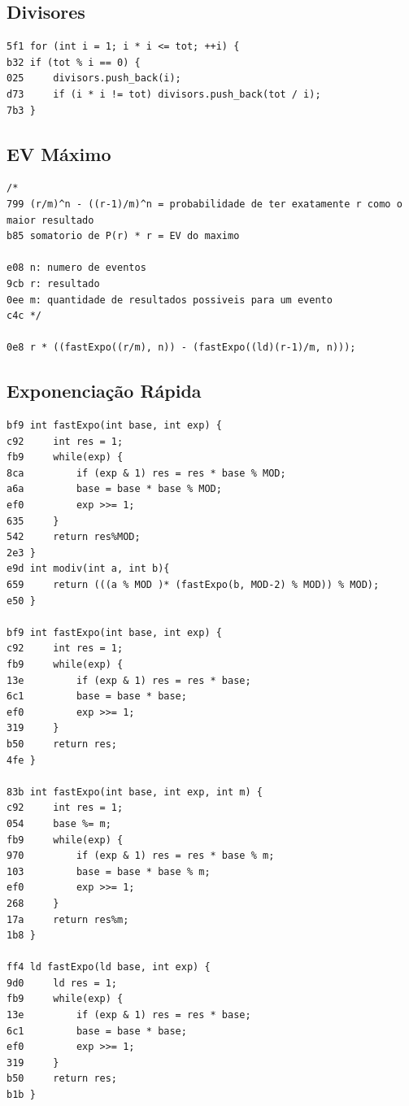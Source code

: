 \documentclass[11pt, a4paper, twoside]{article}
\begin{document}
\subsection{Divisores}
\begin{lstlisting}
5f1 for (int i = 1; i * i <= tot; ++i) {
b32 if (tot % i == 0) {
025     divisors.push_back(i);
d73     if (i * i != tot) divisors.push_back(tot / i);
7b3 }
\end{lstlisting}

\subsection{EV Máximo}
\begin{lstlisting}
/*
799 (r/m)^n - ((r-1)/m)^n = probabilidade de ter exatamente r como o maior resultado 
b85 somatorio de P(r) * r = EV do maximo

e08 n: numero de eventos
9cb r: resultado
0ee m: quantidade de resultados possiveis para um evento
c4c */

0e8 r * ((fastExpo((r/m), n)) - (fastExpo((ld)(r-1)/m, n)));
\end{lstlisting}

\subsection{Exponenciação Rápida}
\begin{lstlisting}
bf9 int fastExpo(int base, int exp) {
c92     int res = 1;
fb9     while(exp) {
8ca         if (exp & 1) res = res * base % MOD;
a6a         base = base * base % MOD;
ef0         exp >>= 1;
635     }
542     return res%MOD;
2e3 }
e9d int modiv(int a, int b){
659     return (((a % MOD )* (fastExpo(b, MOD-2) % MOD)) % MOD);
e50 }

bf9 int fastExpo(int base, int exp) {
c92     int res = 1;
fb9     while(exp) {
13e         if (exp & 1) res = res * base;
6c1         base = base * base;
ef0         exp >>= 1;
319     }
b50     return res;
4fe }

83b int fastExpo(int base, int exp, int m) {
c92     int res = 1;
054     base %= m;
fb9     while(exp) {
970         if (exp & 1) res = res * base % m;
103         base = base * base % m;
ef0         exp >>= 1;
268     }
17a     return res%m;
1b8 }

ff4 ld fastExpo(ld base, int exp) {
9d0     ld res = 1;
fb9     while(exp) {
13e         if (exp & 1) res = res * base;
6c1         base = base * base;
ef0         exp >>= 1;
319     }
b50     return res;
b1b }

\end{lstlisting}
\end{document}
